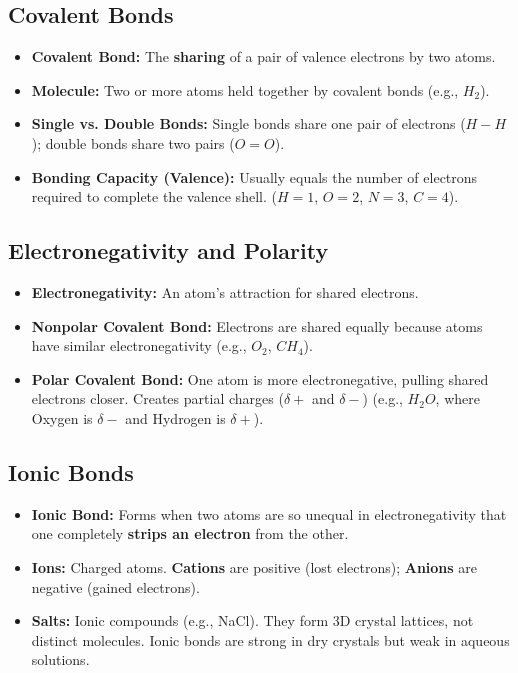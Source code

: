 \documentclass[11pt, a4paper]{article}
\begin{document}
\subsection*{Covalent Bonds}
\begin{itemize}
    \item \textbf{Covalent Bond:} The \textbf{sharing} of a pair of valence electrons by two atoms. 
    \item \textbf{Molecule:} Two or more atoms held together by covalent bonds (e.g., $H_2$).
    \item \textbf{Single vs. Double Bonds:} Single bonds share one pair of electrons ($H-H$); double bonds share two pairs ($O=O$).
    \item \textbf{Bonding Capacity (Valence):} Usually equals the number of electrons required to complete the valence shell. ($H=1$, $O=2$, $N=3$, $C=4$).
\end{itemize}

\subsection*{Electronegativity and Polarity}
\begin{itemize}
    \item \textbf{Electronegativity:} An atom's attraction for shared electrons.
    \item \textbf{Nonpolar Covalent Bond:} Electrons are shared equally because atoms have similar electronegativity (e.g., $O_2$, $CH_4$).
    \item \textbf{Polar Covalent Bond:} One atom is more electronegative, pulling shared electrons closer. Creates partial charges ($\delta+$ and $\delta-$) (e.g., $H_2O$, where Oxygen is $\delta-$ and Hydrogen is $\delta+$).
\end{itemize}

\subsection*{Ionic Bonds}
\begin{itemize}
    \item \textbf{Ionic Bond:} Forms when two atoms are so unequal in electronegativity that one completely \textbf{strips an electron} from the other.
    \item \textbf{Ions:} Charged atoms. \textbf{Cations} are positive (lost electrons); \textbf{Anions} are negative (gained electrons).
    \item \textbf{Salts:} Ionic compounds (e.g., NaCl). They form 3D crystal lattices, not distinct molecules. Ionic bonds are strong in dry crystals but weak in aqueous solutions.
\end{itemize}
\end{document}
